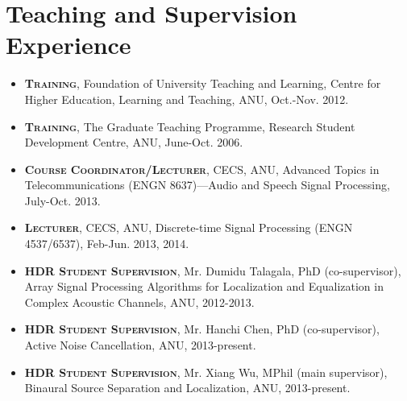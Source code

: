 \documentclass[11pt]{article}
\begin{document}
\section*{Teaching and Supervision Experience}
%
\begin{itemize}
%
\item \textsc{\textbf{Training}}, Foundation of University Teaching and Learning, Centre for Higher Education, Learning and Teaching, ANU, Oct.-Nov. 2012.

\item \textsc{\textbf{Training}}, The Graduate Teaching Programme, Research Student Development Centre, ANU,
June-Oct. 2006.

\item \textsc{\textbf{Course Coordinator/Lecturer}}, CECS, ANU, Advanced Topics in Telecommunications (ENGN 8637)---Audio and Speech Signal Processing, July-Oct. 2013.

\item \textsc{\textbf{Lecturer}}, CECS, ANU, Discrete-time Signal Processing (ENGN 4537/6537), Feb-Jun. 2013, 2014.

\item \textsc{\textbf{HDR Student Supervision}}, Mr. Dumidu Talagala, PhD (co-supervisor), Array Signal Processing Algorithms for Localization and Equalization in Complex Acoustic Channels, ANU, 2012-2013.

\item \textsc{\textbf{HDR Student Supervision}}, Mr. Hanchi Chen, PhD (co-supervisor), Active Noise Cancellation, ANU, 2013-present.

\item \textsc{\textbf{HDR Student Supervision}}, Mr. Xiang Wu, MPhil (main supervisor), Binaural Source Separation and Localization, ANU, 2013-present.
\end{itemize}


\end{document}
